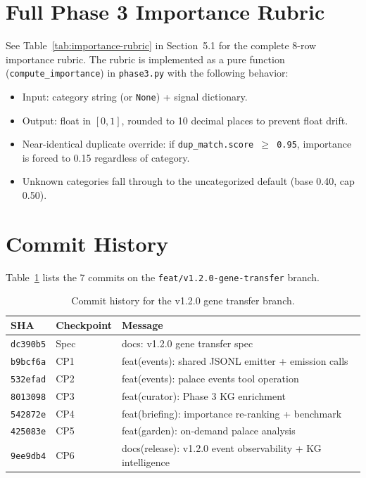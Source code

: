 \documentclass[11pt]{article}
\begin{document}
\section{Full Phase 3 Importance Rubric}
\label{app:rubric}

See Table~\ref{tab:importance-rubric} in Section~5.1 for the complete
8-row importance rubric. The rubric is implemented as a pure function
(\texttt{compute\_importance}) in \texttt{phase3.py} with the following
behavior:

\begin{itemize}[nosep]
    \item Input: category string (or \texttt{None}) + signal dictionary.
    \item Output: float in $[0, 1]$, rounded to 10 decimal places to
          prevent float drift.
    \item Near-identical duplicate override: if
          \texttt{dup\_match.score $\geq$ 0.95}, importance is forced
          to 0.15 regardless of category.
    \item Unknown categories fall through to the uncategorized default
          (base 0.40, cap 0.50).
\end{itemize}

\section{Commit History}
\label{app:commits}

Table~\ref{tab:commits} lists the 7 commits on the
\texttt{feat/v1.2.0-gene-transfer} branch.

\begin{table}[H]
\centering
\caption{Commit history for the v1.2.0 gene transfer branch.}
\label{tab:commits}
\small
\begin{tabular}{@{}lll@{}}
\toprule
\textbf{SHA} & \textbf{Checkpoint} & \textbf{Message} \\
\midrule
\texttt{dc390b5} & Spec     & docs: v1.2.0 gene transfer spec \\
\texttt{b9bcf6a} & CP1      & feat(events): shared JSONL emitter + emission calls \\
\texttt{532efad} & CP2      & feat(events): palace events tool operation \\
\texttt{8013098} & CP3      & feat(curator): Phase 3 KG enrichment \\
\texttt{542872e} & CP4      & feat(briefing): importance re-ranking + benchmark \\
\texttt{425083e} & CP5      & feat(garden): on-demand palace analysis \\
\texttt{9ee9db4} & CP6      & docs(release): v1.2.0 event observability + KG intelligence \\
\bottomrule
\end{tabular}
\end{table}
\end{document}

